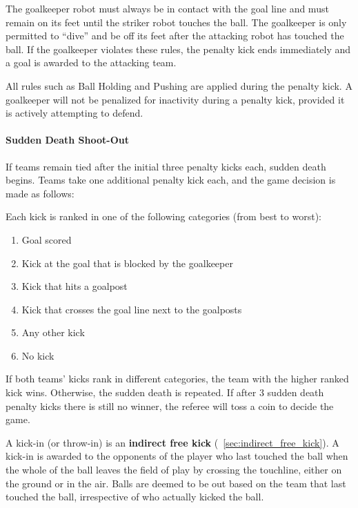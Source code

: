 The goalkeeper robot must always be in contact with the goal line and must remain on its feet until the striker robot touches the ball. The goalkeeper is only permitted to ``dive'' and be off its feet after the attacking robot has touched the ball. If the goalkeeper violates these rules, the penalty kick ends immediately and a goal is awarded to the attacking team.

All rules such as Ball Holding and Pushing are applied during the penalty kick. A goalkeeper will not be penalized for inactivity during a penalty kick, provided it is actively attempting to defend.

\paragraph{Sudden Death Shoot-Out}
\label{sec:sudden_death_shoot_out}

If teams remain tied after the initial three penalty kicks each, sudden death begins. Teams take one additional penalty kick each, and the game decision is made as follows:

Each kick is ranked in one of the following categories (from best to worst):
\begin{enumerate}
  \item Goal scored
  \item Kick at the goal that is blocked by the goalkeeper
  \item Kick that hits a goalpost
  \item Kick that crosses the goal line next to the goalposts
  \item Any other kick
  \item No kick
\end{enumerate}

If both teams' kicks rank in different categories, the team with the higher ranked kick wins. Otherwise, the sudden death is repeated. If after 3 sudden death penalty kicks there is still no winner, the referee will toss a coin to decide the game.

\label{sec:kick_in}

A kick-in (or throw-in) is an \textbf{indirect free kick} (\cf~\cref{sec:indirect_free_kick}). A kick-in is awarded to the opponents of the player who last touched the ball when the whole of the ball leaves the field of play by crossing the touchline, either on the ground or in the air. Balls are deemed to be out based on the team that last touched the ball, irrespective of who actually kicked the ball.

